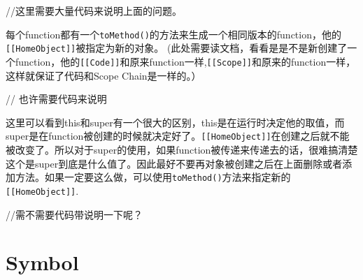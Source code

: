 \begin{JavaScript}
//这里需要大量代码来说明上面的问题。
\end{JavaScript}

每个function都有一个\lstinline$toMethod()$的方法来生成一个相同版本的function，他的\lstinline$[[HomeObject]]$被指定为新的对象。
(此处需要读文档，看看是是不是新创建了一个function，他的\lstinline$[[Code]]$和原来function一样,\lstinline$[[Scope]]$和原来的function一样，这样就保证了代码和Scope Chain是一样的。）
\begin{JavaScript}
// 也许需要代码来说明
\end{JavaScript}

这里可以看到this和super有一个很大的区别，this是在运行时决定他的取值，而super是在function被创建的时候就决定好了。\lstinline$[[HomeObject]]$在创建之后就不能被改变了。所以对于super的使用，如果function被传递来传递去的话，很难搞清楚这个是super到底是什么值了。因此最好不要再对象被创建之后在上面删除或者添加方法。如果一定要这么做，可以使用\lstinline$toMethod()$方法来指定新的\lstinline$[[HomeObject]]$.

\begin{JavaScript}
//需不需要代码带说明一下呢？
\end{JavaScript}

\section{Symbol}




